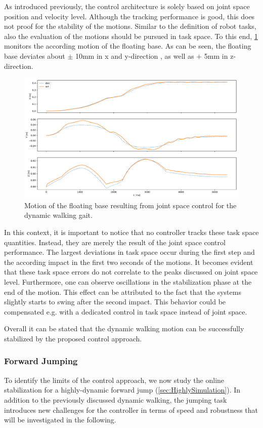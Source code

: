 As introduced previously, the control architecture is solely based on joint space position and velocity level. Although the tracking performance is good, this does not proof for the stability of the motions. Similar to the definition of robot tasks, also the evaluation of the motions should be pursued in task space. To this end, \cref{fig:walkDynamic_pybulletBase} monitors the according motion of the floating base. As can be seen, the floating base deviates about $\pm$ 10mm in x and y-direction , as well as $+$ 5mm in z-direction. 
\begin{figure}[h!]
\centering	
\includegraphics[width=1\textwidth]{fig/walkDynamic/pybullet/pybulletBase}
\caption{Motion of the floating base resulting from joint space control for the dynamic walking gait.}
\label{fig:walkDynamic_pybulletBase}
\end{figure}

In this context, it is important to notice that no controller tracks these task space quantities. Instead, they are merely the result of the joint space control performance. The largest deviations in task space occur during the first step and the according impact in the first two seconds of the motions. It becomes evident that these task space errors do not correlate to the peaks discussed on joint space level. Furthermore, one can observe oscillations in the stabilization phase at the end of the motion. This effect can be attributed to the fact that the systems slightly starts to swing after the second impact. This behavior could be compensated e.g. with a dedicated control in task space instead of joint space. 

Overall it can be stated that the dynamic walking motion can be successfully stabilized by the proposed control approach. 

\subsubsection{Forward Jumping}
To identify the limits of the control approach, we now study the online stabilization for a highly-dynamic forward jump (\cref{sec:HighlySimulation}). In addition to the previously discussed dynamic walking, the jumping task introduces new challenges for the controller in terms of speed and robustness that will be investigated in the following.  

